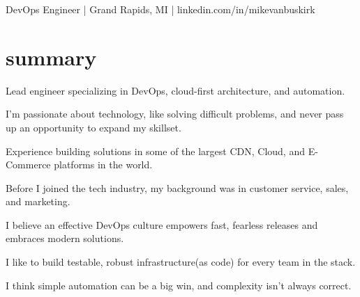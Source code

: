 \documentclass[]{mv_cv}
\begin{document}
       {DevOps Engineer | Grand Rapids, MI | linkedin.com/in/mikevanbuskirk}
 
\section{summary}
\begin{content}
{
Lead engineer specializing in DevOps, cloud-first architecture, and automation.

I'm passionate about technology, like solving difficult problems, and never pass up an opportunity to expand my skillset.

Experience building solutions in some of the largest CDN, Cloud, and E-Commerce platforms in the world.

Before I joined the tech industry, my background was in customer service, sales, and marketing.

I believe an effective DevOps culture empowers fast, fearless releases and embraces modern solutions.

I like to build testable, robust infrastructure(as code) for every team in the stack.

I think simple automation can be a big win, and complexity isn't always correct.
}
\end{content}
\end{document}
